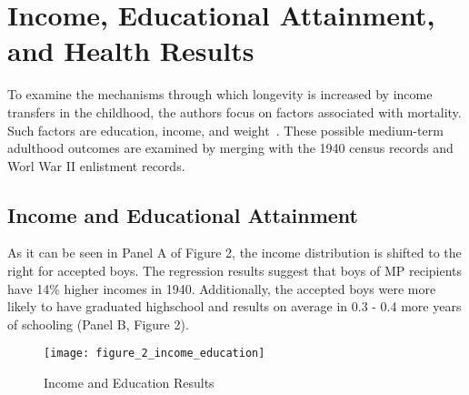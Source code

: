 \section{Income, Educational Attainment, and Health Results}\label{other results}
To examine the mechanisms through which longevity is increased by income
transfers in the childhood, the authors focus on factors associated with
mortality. Such factors are education, income, and
weight~\citep{Flegal_2005, Cutler_2006, Deaton_2001}.
These possible medium-term adulthood outcomes are examined by merging
with the 1940 census records and Worl War II enlistment records.
\subsection{Income and Educational Attainment}
As it can be seen in Panel A of Figure 2, the income distribution is
shifted to the right for accepted boys. The regression results suggest that boys of
MP recipients have 14\% higher incomes in 1940. Additionally, the
accepted boys were more likely to have graduated highschool and results
on average in 0.3 - 0.4 more years of schooling (Panel B, Figure 2).
\begin{figure}[h!]
\begin{center}
\texttt{[image: figure\_2\_income\_education]}
\caption{{Income and Education Results
}}
\end{center}
\end{figure}
